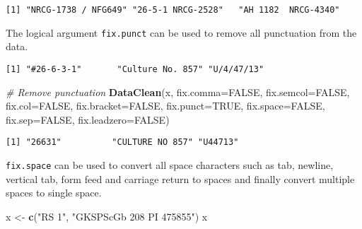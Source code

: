 \documentclass[
]{article}
\newenvironment{Shaded}{\begin{snugshade}}{\end{snugshade}}
\newcommand{\CommentTok}[1]{\textcolor[rgb]{0.56,0.35,0.01}{\textit{#1}}}
\newcommand{\DataTypeTok}[1]{\textcolor[rgb]{0.13,0.29,0.53}{#1}}
\newcommand{\KeywordTok}[1]{\textcolor[rgb]{0.13,0.29,0.53}{\textbf{#1}}}
\newcommand{\NormalTok}[1]{#1}
\newcommand{\OtherTok}[1]{\textcolor[rgb]{0.56,0.35,0.01}{#1}}
\newcommand{\StringTok}[1]{\textcolor[rgb]{0.31,0.60,0.02}{#1}}
\begin{document}
\begin{verbatim}
[1] "NRCG-1738 / NFG649" "26-5-1 NRCG-2528"   "AH 1182  NRCG-4340"
\end{verbatim}

The logical argument \texttt{fix.punct} can be used to remove all
punctuation from the data.

\begin{Shaded}
\end{Shaded}

\begin{verbatim}
[1] "#26-6-3-1"       "Culture No. 857" "U/4/47/13"      
\end{verbatim}

\begin{Shaded}
\begin{Highlighting}[]
\CommentTok{# Remove punctuation}
\KeywordTok{DataClean}\NormalTok{(x, }\DataTypeTok{fix.comma=}\OtherTok{FALSE}\NormalTok{, }\DataTypeTok{fix.semcol=}\OtherTok{FALSE}\NormalTok{, }\DataTypeTok{fix.col=}\OtherTok{FALSE}\NormalTok{, }\DataTypeTok{fix.bracket=}\OtherTok{FALSE}\NormalTok{,}
          \DataTypeTok{fix.punct=}\OtherTok{TRUE}\NormalTok{,}
          \DataTypeTok{fix.space=}\OtherTok{FALSE}\NormalTok{, }\DataTypeTok{fix.sep=}\OtherTok{FALSE}\NormalTok{, }\DataTypeTok{fix.leadzero=}\OtherTok{FALSE}\NormalTok{)}
\end{Highlighting}
\end{Shaded}

\begin{verbatim}
[1] "26631"          "CULTURE NO 857" "U44713"        
\end{verbatim}

\texttt{fix.space} can be used to convert all space characters such as
tab, newline, vertical tab, form feed and carriage return to spaces and
finally convert multiple spaces to single space.

\begin{Shaded}
\begin{Highlighting}[]
\NormalTok{x <-}\StringTok{ }\KeywordTok{c}\NormalTok{(}\StringTok{"RS   1"}\NormalTok{, }\StringTok{"GKSPScGb 208  PI 475855"}\NormalTok{)}
\NormalTok{x}
\end{Highlighting}
\end{Shaded}
\end{document}
